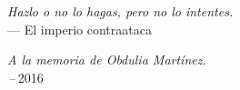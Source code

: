 \cleardoubleemptypage
\thispagestyle{empty}
{}

\vspace*{3cm}

\begin{flushright}
    \textit{Hazlo o no lo hagas, pero no lo intentes.} \\ \medskip
    --- El imperio contraataca
\end{flushright}


\medskip

\begin{flushright}
    \textit{A la memoria de Obdulia Mart\'inez.} \\ \,--\,2016
\end{flushright}